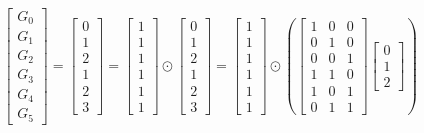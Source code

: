 \documentclass{article}%
\begin{document}
\[%
\left[\begin{matrix}G_{0}\\G_{1}\\G_{2}\\G_{3}\\G_{4}\\G_{5}\end{matrix}\right] = \left[\begin{matrix}0\\1\\2\\1\\2\\3\end{matrix}\right] = \left[\begin{matrix}1\\1\\1\\1\\1\\1\end{matrix}\right] \odot \left[\begin{matrix}0\\1\\2\\1\\2\\3\end{matrix}\right] = \left[\begin{matrix}1\\1\\1\\1\\1\\1\end{matrix}\right] \odot \left( \left[\begin{matrix}1 & 0 & 0\\0 & 1 & 0\\0 & 0 & 1\\1 & 1 & 0\\1 & 0 & 1\\0 & 1 & 1\end{matrix}\right] \left[\begin{matrix}0\\1\\2\end{matrix}\right] \right)%
\]%
\end{document}
